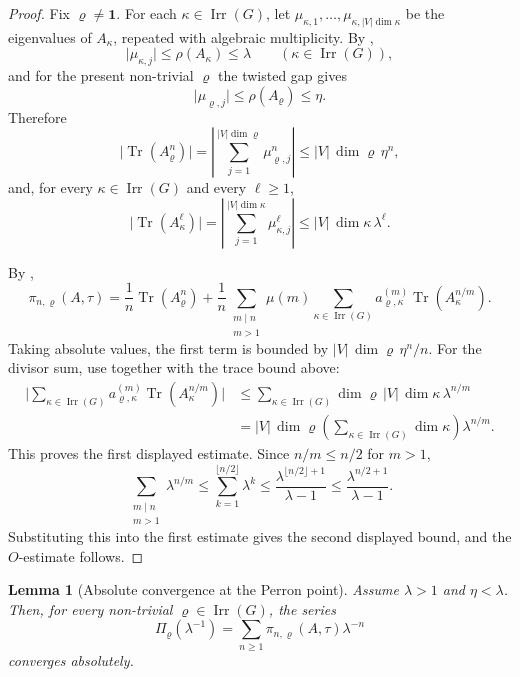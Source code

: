 \documentclass[11pt,a4paper]{amsart}
\theoremstyle{plain}
\newtheorem{lemma}[theorem]{Lemma}
\theoremstyle{definition}
\theoremstyle{remark}
\DeclareMathOperator{\Tr}{Tr}
\DeclareMathOperator{\Irr}{Irr}
\newcommand{\abs}[1]{\lvert #1 \rvert}
\begin{document}
\begin{proof}
  Fix \(\varrho\neq\mathbf 1\). For each
  \(\kappa\in\Irr(G)\), let
  \(\mu_{\kappa,1},\dots,\mu_{\kappa,|V|\dim\kappa}\) be the eigenvalues
  of \(A_\kappa\), repeated with algebraic multiplicity. By
  ,
  \[
    \abs{\mu_{\kappa,j}}\le \rho(A_\kappa)\le \lambda
    \qquad
    (\kappa\in\Irr(G)),
  \]
  and for the present non-trivial \(\varrho\) the twisted gap gives
  \[
    \abs{\mu_{\varrho,j}}\le \rho(A_\varrho)\le \eta.
  \]
  Therefore
  \[
    \abs{\Tr(A_\varrho^n)}
    =
    \left|\sum_{j=1}^{|V|\dim\varrho}\mu_{\varrho,j}^n\right|
    \le |V|\,\dim\varrho\,\eta^n,
  \]
  and, for every \(\kappa\in\Irr(G)\) and every \(\ell\ge 1\),
  \[
    \abs{\Tr(A_\kappa^\ell)}
    =
    \left|\sum_{j=1}^{|V|\dim\kappa}\mu_{\kappa,j}^\ell\right|
    \le |V|\,\dim\kappa\,\lambda^\ell.
  \]

  By ,
  \[
    \pi_{n,\varrho}(A,\tau)
    =
    \frac{1}{n}\Tr(A_\varrho^n)
    +\frac{1}{n}
      \sum_{\substack{m\mid n\\ m>1}}\mu(m)
        \sum_{\kappa\in\Irr(G)}
          a_{\varrho,\kappa}^{(m)}\Tr(A_\kappa^{n/m}).
  \]
  Taking absolute values, the first term is bounded by
  \(|V|\,\dim\varrho\,\eta^n/n\). For the divisor sum, use
   together with the trace bound
  above:
  \begin{align*}
    \abs{
      \sum_{\kappa\in\Irr(G)}
        a_{\varrho,\kappa}^{(m)}\Tr(A_\kappa^{n/m})
    }
    &\le
    \sum_{\kappa\in\Irr(G)}
      \dim\varrho\,|V|\,\dim\kappa\,\lambda^{n/m} \\
    &=
    |V|\,\dim\varrho
      \left(\sum_{\kappa\in\Irr(G)}\dim\kappa\right)\lambda^{n/m}.
  \end{align*}
  This proves the first displayed estimate. Since \(n/m\le n/2\) for
  \(m>1\),
  \[
    \sum_{\substack{m\mid n\\ m>1}}\lambda^{n/m}
    \le \sum_{k=1}^{\lfloor n/2\rfloor}\lambda^k
    \le \frac{\lambda^{\lfloor n/2\rfloor+1}}{\lambda-1}
    \le \frac{\lambda^{n/2+1}}{\lambda-1}.
  \]
  Substituting this into the first estimate gives the second displayed
  bound, and the \(O\)-estimate follows.
\end{proof}

\begin{lemma}[Absolute convergence at the Perron point]
  \label{lem:nontrivial-perron-point-convergence}
  Assume \(\lambda>1\) and \(\eta<\lambda\). Then, for every non-trivial
  \(\varrho\in\Irr(G)\), the series
  \[
    \Pi_\varrho(\lambda^{-1})
    =\sum_{n\ge 1}\pi_{n,\varrho}(A,\tau)\lambda^{-n}
  \]
  converges absolutely.
\end{lemma}
\end{document}
